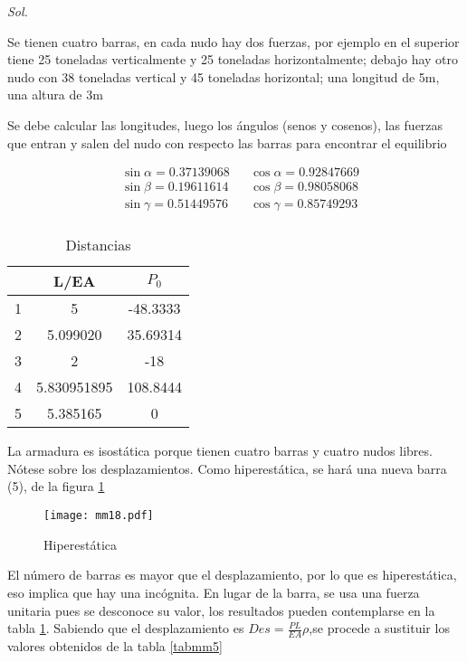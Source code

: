 \textit{ Sol. }

  Se tienen cuatro barras, en cada nudo hay dos fuerzas, por ejemplo en el superior tiene 25 toneladas verticalmente y 25 toneladas horizontalmente; 
debajo hay otro nudo con 38 toneladas vertical y 45 toneladas horizontal; una longitud de 5m, una altura de 3m

Se debe calcular las longitudes, luego los ángulos (senos y cosenos), las fuerzas que entran y salen del nudo con respecto las barras para encontrar el equilibrio

\begin{align*}
  &\sin{\alpha} = 0.37139068&& \cos{\alpha} = 0.92847669\\
  &\sin{\beta} = 0.19611614&& \cos{\beta} = 0.98058068\\
  &\sin{\gamma} = 0.51449576&& \cos{\gamma} = 0.85749293\\
\end{align*}

\begin{table}[h!]
  \centering
  \begin{tabular}{@{}ccc@{}}
  \toprule
    & L/EA        & $P_0$    \\ \midrule
  1 & 5           & -48.3333 \\
  2 & 5.099020    & 35.69314 \\
  3 & 2           & -18      \\
  4 & 5.830951895 & 108.8444 \\
  5 & 5.385165    & 0        \\ \bottomrule
  \end{tabular}
  \caption{Distancias}
  \label{tabmm4}
\end{table}

La armadura es isostática porque tienen cuatro barras y cuatro nudos libres. Nótese sobre los desplazamientos.
Como hiperestática, se hará una nueva barra (5), de la figura \ref{mm18}
\begin{figure}[h!]
  \centering
\centering
\texttt{[image: mm18.pdf]}
\caption{Hiperestática}
\label{mm18}
\end{figure}

El número de barras es mayor que el desplazamiento, por lo que es hiperestática, eso implica que hay una incógnita.
En lugar de la barra, se usa una fuerza unitaria pues se desconoce su valor, los resultados pueden contemplarse en la tabla \ref{tabmm4}.
Sabiendo que el desplazamiento es $Des=\frac{PL}{EA}\rho$,se procede a sustituir los valores obtenidos de la tabla \ref{tabmm5}


